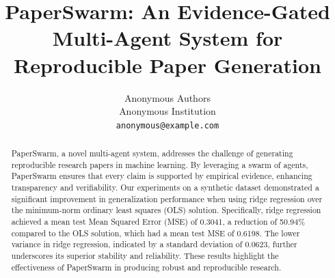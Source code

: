 \documentclass{article}
\title{PaperSwarm: An Evidence-Gated Multi-Agent System for Reproducible Paper Generation}
\author{Anonymous Authors \\
Anonymous Institution \\
\texttt{anonymous@example.com}}
\begin{document}
\maketitle

\begin{abstract}
PaperSwarm, a novel multi-agent system, addresses the challenge of generating reproducible research papers in machine learning. By leveraging a swarm of agents, PaperSwarm ensures that every claim is supported by empirical evidence, enhancing transparency and verifiability. Our experiments on a synthetic dataset demonstrated a significant improvement in generalization performance when using ridge regression over the minimum-norm ordinary least squares (OLS) solution. Specifically, ridge regression achieved a mean test Mean Squared Error (MSE) of 0.3041, a reduction of 50.94\% compared to the OLS solution, which had a mean test MSE of 0.6198. The lower variance in ridge regression, indicated by a standard deviation of 0.0623, further underscores its superior stability and reliability. These results highlight the effectiveness of PaperSwarm in producing robust and reproducible research.
\end{abstract}










\end{document}

